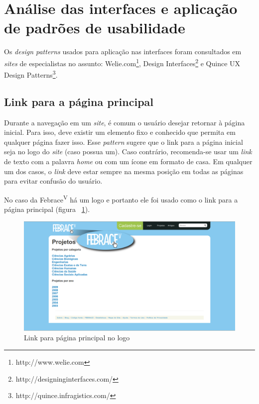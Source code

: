 \section{Análise das interfaces e aplicação de padrões de usabilidade}

Os \textit{design patterns} usados para aplicação nas interfaces foram consultados em \textit{sites} de especialistas no assunto: Welie.com\footnote{http://www.welie.com}, Design Interfaces\footnote{http://designinginterfaces.com/} e Quince UX Design Patterns\footnote{http://quince.infragistics.com/}.

\subsection{Link para a página principal}

Durante a navegação em um \textit{site}, é comum o usuário desejar retornar à página inicial. Para isso, deve existir um elemento fixo e conhecido que permita em qualquer página fazer isso. Esse \textit{pattern} sugere que o link para a página inicial seja no logo do \textit{site} (caso possua um). Caso contrário, recomenda-se usar um \textit{link} de texto com a palavra \textit{home} ou com um ícone em formato de casa. Em qualquer um dos casos, o \textit{link} deve estar sempre na mesma posição em todas as páginas para evitar confusão do usuário.

No caso da Febrace\textsuperscript{V} há um logo e portanto ele foi usado como o link para a página principal (figura ~\ref{home_link}).

    \begin{figure}[h]
        \begin{center}
    \includegraphics[width=1.0\linewidth]{arquivos/home_link.png}
        \end{center}
        \caption{Link para página principal no logo}
        \label{home_link}
    \end{figure}

